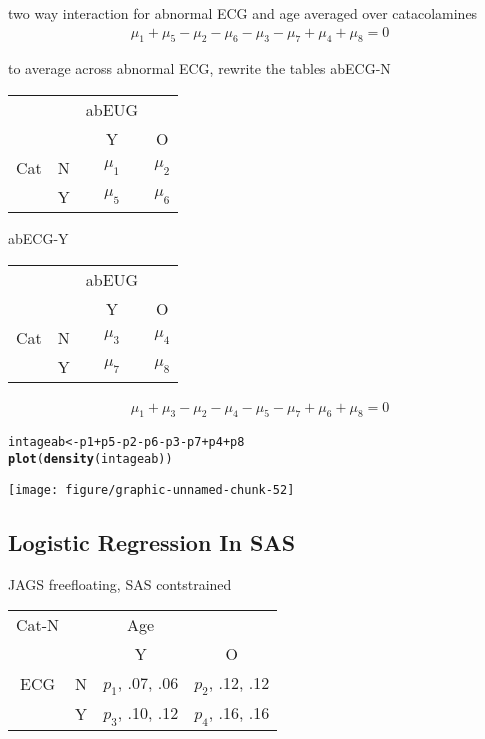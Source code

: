 \documentclass[12pt,letterpaper,oneside]{article}\usepackage{graphicx, color}
\makeatletter
\newcommand{\hlfunctioncall}[1]{\textcolor[rgb]{0.501960784313725,0,0.329411764705882}{\textbf{#1}}}%
\newenvironment{kframe}{%
 \def\at@end@of@kframe{}%
 \ifinner\ifhmode%
  \def\at@end@of@kframe{\end{minipage}}%
  \begin{minipage}{\columnwidth}%
 \fi\fi%
 \def\FrameCommand##1{\hskip\@totalleftmargin \hskip-\fboxsep
 \colorbox{shadecolor}{##1}\hskip-\fboxsep
     \hskip-\linewidth \hskip-\@totalleftmargin \hskip\columnwidth}%
 \MakeFramed {\advance\hsize-\width
   \@totalleftmargin\z@ \linewidth\hsize
   \@setminipage}}%
 {\par\unskip\endMakeFramed%
 \at@end@of@kframe}
\newenvironment{knitrout}{}{} %
\newcommand{\dateTaken}{January 7, 2013}
\makeatother
\begin{document}
two way interaction for abnormal ECG and age averaged over catacolamines
\begin{align*}
    \mu_{1} + \mu_{5} - \mu_{2} - \mu_{6} - \mu_{3} - \mu_{7} + \mu_{4} + \mu_{8} = 0
\end{align*}

to average across abnormal ECG, rewrite the tables
abECG-N
\begin{tabular}{cccc}
      &  & abEUG & \\
      &  & Y & O\\
Cat   & N & $\mu_1$ & $\mu_2$ \\
      & Y & $\mu_5$ & $\mu_6$ \\
\end{tabular}

abECG-Y
\begin{tabular}{cccc}
      &  & abEUG & \\
      &  & Y & O\\
Cat   & N & $\mu_3$ & $\mu_4$ \\
      & Y & $\mu_7$ & $\mu_8$ \\
\end{tabular}
\begin{align*}
    \mu_{1} + \mu_{3} - \mu_{2} - \mu_{4} - \mu_{5} - \mu_{7} + \mu_{6} + \mu_{8} = 0
\end{align*}
\begin{knitrout}\scriptsize
{}\color{fgcolor}\begin{kframe}
\begin{alltt}
intageab <- p1 + p5 - p2 - p6 - p3 - p7 + p4 + p8
\hlfunctioncall{plot}(\hlfunctioncall{density}(intageab))
\end{alltt}
\end{kframe}

{\centering \texttt{[image: figure/graphic-unnamed-chunk-52]} 

}



\end{knitrout}

\renewcommand{\dateTaken}{March 19, 2013}
\daysep
\subsection{Logistic Regression In SAS} %
\label{sub:logistic_regression_in_sas}

JAGS freefloating, SAS contstrained

\begin{tabular}{cccc}
\hline
Cat-N &  & Age & \\
      &  & Y & O\\
ECG   & N & $p_1$, .07, .06 & $p_2$, .12, .12 \\
      & Y & $p_3$, .10, .12 & $p_4$, .16, .16 \\
      \hline
\end{tabular}
\end{document}
